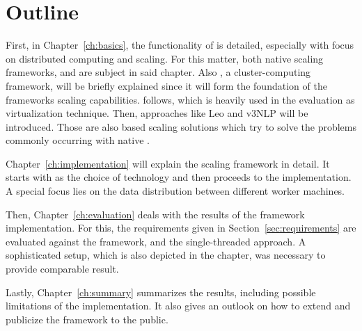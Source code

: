 \section{Outline}
First, in Chapter~\ref{ch:basics}, the functionality of \uima{} is detailed, especially with focus on distributed computing and scaling. For this matter, both native \uima{} scaling frameworks, \uimaas{} and \cpe{} are subject in said chapter. Also \spark{}, a cluster-computing framework, will be briefly explained since it will form the foundation of the frameworks scaling capabilities. \docker{} follows, which is heavily used in the evaluation as virtualization technique. Then, approaches like Leo and v3NLP will be introduced. Those are also \uimaas{} based scaling solutions which try to solve the problems commonly occurring with native \uimaas{}.

Chapter~\ref{ch:implementation} will explain the scaling framework in detail. It starts with \spark{} as the choice of technology and then proceeds to the implementation. A special focus lies on the data distribution between different worker machines.

Then, Chapter~\ref{ch:evaluation} deals with the results of the framework implementation. For this, the requirements given in Section~\ref{sec:requirements} are evaluated against the framework, \uimaas{} and the single-threaded approach. A sophisticated setup, which is also depicted in the chapter, was necessary to provide comparable result.

Lastly, Chapter~\ref{ch:summary} summarizes the results, including possible limitations of the implementation. It also gives an outlook on how to extend and publicize the framework to the public.